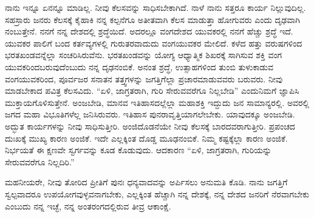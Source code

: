 ನಾನು ಇನ್ನೂ ಏನನ್ನೂ ಮಾಡಿಲ್ಲ. ನೀವು ಕೆಲಸವನ್ನು ಸಾಧಿಸಬೇಕಾಗಿದೆ. ನಾಳೆ ನಾನು ಸತ್ತರೂ ಕಾರ್ಯ ನಿಲ್ಲುವುದಿಲ್ಲ. ಸಹಸ್ರಾರು ಜನರು ಕೆಲಸಕ್ಕೆ ಕೈಹಾಕಿ ನನ್ನ ಕಲ್ಪನೆಗೂ ಅತೀತವಾಗಿ ಕೆಲಸ ಮಾಡುತ್ತಾ ಹೋಗುವರು ಎಂದು ದೃಢವಾಗಿ ನಂಬುತ್ತೇನೆ. ನನಗೆ ನನ್ನ ದೇಶದಲ್ಲಿ ಶ್ರದ್ಧೆಯಿದೆ. ಅದರಲ್ಲೂ ವಂಗದೇಶದ ಯುವಕರಲ್ಲಿ ನನಗೆ ಹೆಚ್ಚು ಶ್ರದ್ಧೆ ಇದೆ. ಯುವಕರ ಪಾಲಿಗೆ ಬಂದ ಕರ್ತವ್ಯಗಳಲ್ಲಿ ಗುರುತರವಾದುದು ವಂಗಯುವಕರ ಮೇಲಿದೆ. ಕಳೆದ ಹತ್ತು ವರುಷಗಳಿಂದ ಭರತಖಂಡವನ್ನೆಲ್ಲಾ ಸಂಚರಿಸಿರುವೆನು. ಭರತಖಂಡ\-ವನ್ನು ಯೋಗ್ಯ ಆಧ್ಯಾತ್ಮಿಕ ಶಿಖರಕ್ಕೆ ಸಾಗಿಸುವ ಶಕ್ತಿ ವಂಗ ಯುವಕರಿಂದ\break ಬರುವುದೆಂಬುದು ನನ್ನ ದೃಢನಂಬಿಕೆ. ಅನಂತ ಶ್ರದ್ಧೆ, ಉತ್ಸಾಹಗಳಿಂದ ತುಂಬಿ ತುಳುಕಾಡುವ ವಂಗಯುವಕರಿಂದ, ಪೂರ್ವಜರ ಸನಾತನ ತತ್ತ್ವಗಳನ್ನು ಜಗತ್ತಿಗೆಲ್ಲಾ ಪ್ರಚಾರಮಾಡುವವರು ಬರುವರು. ನೀವು ಮಾಡಬೇಕಾದ ಪವಿತ್ರ ಕೆಲಸವಿದು. “ಏಳಿ, ಜಾಗ್ರತರಾಗಿ, ಗುರಿ ಸೇರುವವರೆಗೂ ನಿಲ್ಲಬೇಡಿ” ಎಂದು\break ನಿಮಗೆ ಜ್ಞಾಪಿಸಿ ಮುಕ್ತಾಯಗೊಳಿಸುತ್ತೇನೆ. ಅಂಜಬೇಡಿ, ಮಾನವ ಇತಿಹಾಸ\-ದಲ್ಲೆಲ್ಲಾ ಮಹಾಶಕ್ತಿ ಇದ್ದುದು ಜನ ಸಾಮಾನ್ಯರಲ್ಲಿ. ಅವರಲ್ಲಿ ಜಗದ ಮಹಾ ವಿಭೂತಿಗಳೆಲ್ಲ ಜನಿಸಿರುವರು. ಇತಿಹಾಸ ಪುನರಾವೃತ್ತಿಯಾಗಲೇಬೇಕು. ಯಾವುದಕ್ಕೂ ಅಂಜಬೇಡಿ. ಅದ್ಭುತ ಕಾರ್ಯಗಳನ್ನು ನೀವು ಸಾಧಿಸುತ್ತೀರಿ. ಅಂಜಿದೊಡನೆಯೇ ನೀವು ಕೆಲಸಕ್ಕೆ ಬಾರದವರಾಗುತ್ತೀರಿ. ಪ್ರಪಂಚದ ದುಃಖಕ್ಕೆ ಮುಖ್ಯ ಕಾರಣ ಅಂಜಿಕೆ. ಇದೇ ಎಲ್ಲಕ್ಕಿಂತ ದೊಡ್ಡ ಮೂಢನಂಬಿಕೆ. ನಿಮ್ಮ ಕಷ್ಟಕ್ಕೆಲ್ಲಾ ಕಾರಣ ಅಂಜಿಕೆ. ನಿರ್ಭಯತೆ ಈ ಕ್ಷಣವೇ ಸ್ವರ್ಗವನ್ನು ಕೂಡ ಕೊಡುವುದು. ಆದಕಾರಣ “ಏಳಿ, ಜಾಗ್ರತರಾಗಿ, ಗುರಿಯನ್ನು ಸೇರುವವರೆಗೂ ನಿಲ್ಲದಿರಿ.”

ಮಹನೀಯರೇ, ನೀವು ತೋರಿದ ಪ್ರೀತಿಗೆ ಪುನಃ ಧನ್ಯವಾದವನ್ನು ಅರ್ಪಿಸಲು ಅನುಮತಿ ಕೊಡಿ. ನಾನು ಜಗತ್ತಿಗೆ ಸ್ವಲ್ಪವಾದರೂ ಉಪಯೋಗವುಳ್ಳವನಾಗಬೇಕು, ಎಲ್ಲಕ್ಕಿಂತ ಹೆಚ್ಚಾಗಿ ನನ್ನ ದೇಶಕ್ಕೆ, ನನ್ನ ದೇಶದ ಜನರಿಗೆ ನೆರವಾಗಬೇಕು ಎಂಬುದು ನನ್ನ ಇಚ್ಛೆ, ನನ್ನ ಅಂತರಂಗದಲ್ಲಿರುವ ತೀವ್ರ ಆಕಾಂಕ್ಷೆ.

